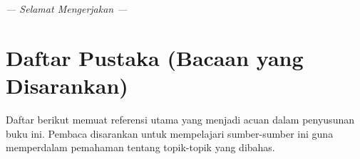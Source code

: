 \documentclass[12pt,a4paper,openany]{book}
\begin{document}
\vspace{1cm}
\begin{center}
\textit{--- Selamat Mengerjakan ---}
\end{center}


\backmatter


\chapter*{Daftar Pustaka (Bacaan yang Disarankan)}

Daftar berikut memuat referensi utama yang menjadi acuan dalam penyusunan buku ini. Pembaca disarankan untuk mempelajari sumber-sumber ini guna memperdalam pemahaman tentang topik-topik yang dibahas.
\end{document}

